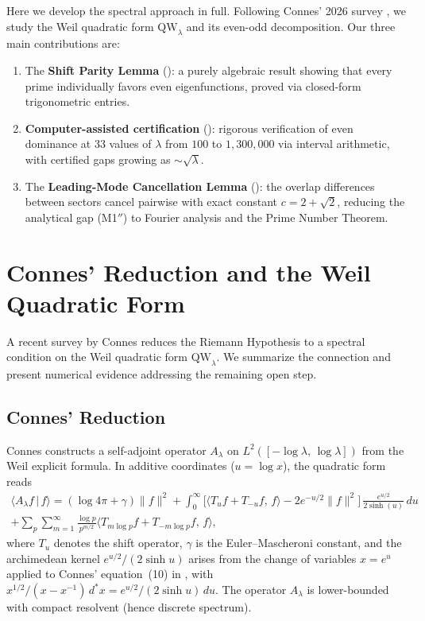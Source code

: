 \documentclass[12pt,a4paper]{article}
\theoremstyle{definition}
\theoremstyle{remark}
\begin{document}
Here we develop the spectral approach in full. Following Connes' 2026 survey \cite{Connes2026}, we study the Weil quadratic form $\mathrm{QW}_\lambda$ and its even-odd decomposition. Our three main contributions are:
\begin{enumerate}
  \item The \textbf{Shift Parity Lemma} (): a purely algebraic result showing that every prime individually favors even eigenfunctions, proved via closed-form trigonometric entries.
  \item \textbf{Computer-assisted certification} (): rigorous verification of even dominance at $33$ values of $\lambda$ from $100$ to $1{,}300{,}000$ via interval arithmetic, with certified gaps growing as $\sim\!\sqrt{\lambda}$.
  \item The \textbf{Leading-Mode Cancellation Lemma} (): the overlap differences between sectors cancel pairwise with exact constant $c = 2 + \sqrt{2}$, reducing the analytical gap (M1$''$) to Fourier analysis and the Prime Number Theorem.
\end{enumerate}


\section{Connes' Reduction and the Weil Quadratic Form}
\label{sec:connes}

A recent survey by Connes \cite{Connes2026} reduces the Riemann Hypothesis to a spectral condition on the Weil quadratic form $\mathrm{QW}_\lambda$. We summarize the connection and present numerical evidence addressing the remaining open step.

\subsection{Connes' Reduction}

Connes constructs a self-adjoint operator $A_\lambda$ on $L^2([-\log\lambda,\,\log\lambda])$ from the Weil explicit formula. In additive coordinates ($u = \log x$), the quadratic form reads
\begin{multline*}
  \langle A_\lambda f \,|\, f \rangle = (\log 4\pi + \gamma)\|f\|^2
  + \int_0^\infty \Big[\langle T_u f + T_{-u} f,\, f \rangle - 2e^{-u/2}\|f\|^2\Big]\,\frac{e^{u/2}}{2\sinh(u)}\,du \\
  + \sum_p \sum_{m=1}^\infty \frac{\log p}{p^{m/2}} \langle T_{m\log p} f + T_{-m\log p} f,\, f \rangle,
\end{multline*}
where $T_u$ denotes the shift operator, $\gamma$ is the Euler--Mascheroni constant, and the archimedean kernel $e^{u/2}/(2\sinh u)$ arises from the change of variables $x = e^u$ applied to Connes' equation~(10) in \cite{Connes2026}, with $x^{1/2}/(x-x^{-1})\,d^*\!x = e^{u/2}/(2\sinh u)\,du$. The operator $A_\lambda$ is lower-bounded with compact resolvent (hence discrete spectrum).
\end{document}
